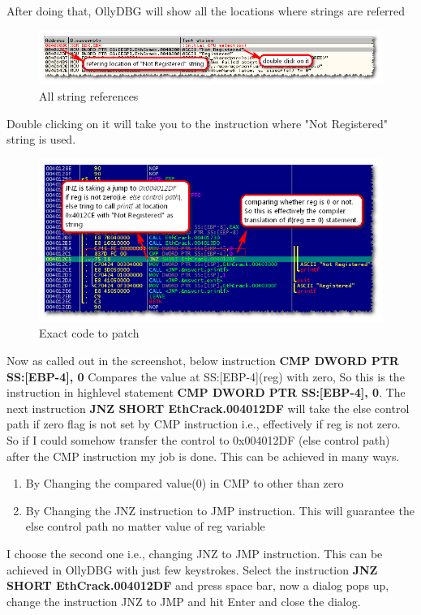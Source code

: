 \documentclass{article}
\begin{document}
After doing that, OllyDBG will show all the locations where strings are referred
\begin{figure}[H]
\centering
\includegraphics[width=\textwidth]{EthicalCracking3.png}
\caption{All string references}
\end{figure}
Double clicking on it will take you to the instruction where "Not Registered" string is used.
\begin{figure}[H]
\centering
\includegraphics[width=\textwidth]{EthicalCracking4.png}
\caption{Exact code to patch}
\end{figure}
Now as called out in the screenshot, below instruction {\textbf{CMP DWORD PTR SS:[EBP-4], 0}} Compares the value at SS:[EBP-4](reg) with zero, So this is the instruction in highlevel statement {\textbf{CMP DWORD PTR SS:[EBP-4], 0}}. The next instruction {\textbf{JNZ SHORT EthCrack.004012DF}} will take the else control path if zero flag is not set by CMP instruction i.e., effectively if reg is not zero. So if I could somehow transfer the control to 0x004012DF (else control path) after the CMP instruction my job is done. This can be achieved in many ways.
\begin{enumerate}[noitemsep]
    \item By Changing the compared value(0) in CMP to other than zero
    \item By Changing the JNZ instruction to JMP instruction. This will guarantee the else control path no matter value of reg variable
\end{enumerate}
I choose the second one i.e., changing JNZ to JMP instruction. This can be achieved in OllyDBG with just few keystrokes. Select the instruction {\textbf{JNZ SHORT EthCrack.004012DF }} and press space bar, now a dialog pops up, change the instruction JNZ to JMP and hit Enter and close the dialog.
\end{document}
